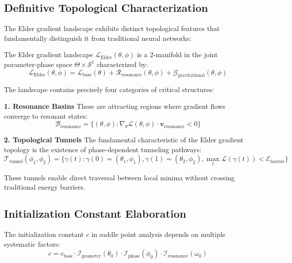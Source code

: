 \subsection{Definitive Topological Characterization}

The Elder gradient landscape exhibits distinct topological features that fundamentally distinguish it from traditional neural networks:

\begin{definition}
The Elder gradient landscape $\mathcal{L}_{\text{Elder}}(\theta, \phi)$ is a 2-manifold in the joint parameter-phase space $\Theta \times \mathcal{S}^1$ characterized by:
\begin{equation}
\mathcal{L}_{\text{Elder}}(\theta, \phi) = \mathcal{L}_{\text{base}}(\theta) + \mathcal{R}_{\text{resonance}}(\theta, \phi) + \mathcal{G}_{\text{gravitational}}(\theta, \phi)
\end{equation}
\end{definition}

The landscape contains precisely four categories of critical structures:

\textbf{1. Resonance Basins}
These are attracting regions where gradient flows converge to resonant states:
\begin{equation}
\mathcal{B}_{\text{resonance}} = \{(\theta, \phi) : \nabla_\theta \mathcal{L}(\theta, \phi) \cdot \mathbf{v}_{\text{resonance}} < 0\}
\end{equation}

\textbf{2. Topological Tunnels}
The fundamental characteristic of the Elder gradient topology is the existence of phase-dependent tunneling pathways:
\begin{equation}
\mathcal{T}_{\text{tunnel}}(\phi_1, \phi_2) = \{\gamma(t) : \gamma(0) = (\theta_1, \phi_1), \gamma(1) = (\theta_2, \phi_2), \max_t \mathcal{L}(\gamma(t)) < \mathcal{E}_{\text{barrier}}\}
\end{equation}

These tunnels enable direct traversal between local minima without crossing traditional energy barriers.

\subsection{Initialization Constant Elaboration}

The initialization constant $c$ in saddle point analysis depends on multiple systematic factors:
\begin{equation}
c = c_{\text{base}} \cdot \mathcal{I}_{\text{geometry}}(\theta_0) \cdot \mathcal{I}_{\text{phase}}(\phi_0) \cdot \mathcal{I}_{\text{resonance}}(\omega_0)
\end{equation}

